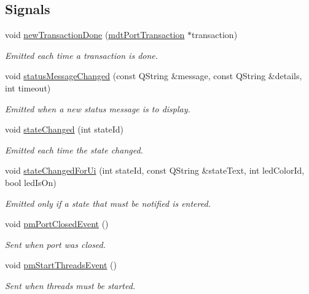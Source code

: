 \subsection*{Signals}
\begin{DoxyCompactItemize}
\item 
void \hyperlink{classmdt_port_manager_a416a24db1048e9f66aef27ea810954d2}{new\-Transaction\-Done} (\hyperlink{classmdt_port_transaction}{mdt\-Port\-Transaction} $\ast$transaction)
\begin{DoxyCompactList}\small\item\em Emitted each time a transaction is done. \end{DoxyCompactList}\item 
void \hyperlink{classmdt_port_manager_a6f6c6f8a8430d8631a08c765565db9ab}{status\-Message\-Changed} (const Q\-String \&message, const Q\-String \&details, int timeout)
\begin{DoxyCompactList}\small\item\em Emitted when a new status message is to display. \end{DoxyCompactList}\item 
void \hyperlink{classmdt_port_manager_a01da0634bc52a71c0df0d83fc166eeda}{state\-Changed} (int state\-Id)
\begin{DoxyCompactList}\small\item\em Emitted each time the state changed. \end{DoxyCompactList}\item 
void \hyperlink{classmdt_port_manager_ae00d513ed335fbd203852dcb7180005c}{state\-Changed\-For\-Ui} (int state\-Id, const Q\-String \&state\-Text, int led\-Color\-Id, bool led\-Is\-On)
\begin{DoxyCompactList}\small\item\em Emitted only if a state that must be notified is entered. \end{DoxyCompactList}\item 
void \hyperlink{classmdt_port_manager_ae77c1b24291797704488beda0009c57a}{pm\-Port\-Closed\-Event} ()
\begin{DoxyCompactList}\small\item\em Sent when port was closed. \end{DoxyCompactList}\item 
void \hyperlink{classmdt_port_manager_aa12ccb053b3ce050a2482a957b28222e}{pm\-Start\-Threads\-Event} ()
\begin{DoxyCompactList}\small\item\em Sent when threads must be started. \end{DoxyCompactList}\item 

\end{DoxyCompactItemize}
